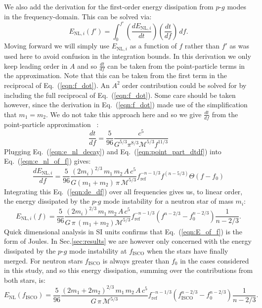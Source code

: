 We also add the derivation for the first-order energy dissipation from $p$-$g$ modes in the frequency-domain. This can be solved via:
\begin{equation}\label{eqn:e_nl_of_f}
    E_{\mathrm{NL}, i}\left(f'\right) = \int_0^{f'} \left(\frac{dE_{\mathrm{NL}, i}}{dt} \right) \left(\frac{dt}{df}\right) \, df.
\end{equation}
Moving forward we will simply use $E_{\mathrm{NL}, i}$ as a function of $f$ rather than $f'$ as was used here to avoid confusion in the integration bounds. In this derivation we only keep leading order in $A$ and so $\frac{dt}{df}$ can be taken from the point-particle terms in the approximation. Note that this can be taken from the first term in the reciprocal of Eq.~(\ref{eqn:f_dot}). An $A^2$ order contribution could be solved for by including the full reciprocal of Eq.~(\ref{eqn:f_dot}). Some care should be taken however, since the derivation in Eq.~(\ref{eqn:f_dot}) made use of the simplification that $m_1 = m_2$. We do not take this approach here and so we give $\frac{dt}{df}$ from the point-particle approximation ~\citep{maggiore2008gravitational}:
\begin{equation}\label{eqn:point_part_dtdf}
    \frac{dt}{df} = \frac{5}{96} \frac{c^5}{G^{5/3}  \pi^{8/3} \mathcal{M}^{5/3} f^{11/3}}
\end{equation}
Plugging Eq.~(\ref{eqn:e_nl_decay}) and Eq.~(\ref{eqn:point_part_dtdf}) into Eq.~(\ref{eqn:e_nl_of_f}) gives:
\begin{equation}\label{eqn:de_df}
    \frac{dE_{\mathrm{NL}, i}}{df} = \frac{5}{96} \frac{\left(2 m_i\right)^{2/3} \, m_1 \, m_2 \, A \, c^5}{G (m_1 + m_2)\, \pi \, \mathcal{M}^{5/3}} f_{\mathrm{ref}}^{-n-1/3} f^{(n-5/3)} \Theta(f-f_0)
\end{equation}
Integrating this Eq.~(\ref{eqn:de_df}) over all frequencies gives us, to linear order, the energy dissipated by the $p$-$g$ mode instability for a neutron star of mass $m_i$:
\begin{equation}\label{eqn:E_of_f}
    E_{\mathrm{NL}, i}(f) = \frac{5}{96} \frac{\left(2 m_i\right)^{2/3} \, m_1 \, m_2 \, A \, c^5}{G \, \pi \, (m_1 + m_2) \mathcal{M}^{5/3}} f_{\mathrm{ref}}^{-n-1/3} \left(f^{n-2/3} -f_0^{n-2/3}\right) \frac{1}{n-2/3}.
\end{equation}
Quick dimensional analysis in SI units confirms that Eq.~(\ref{eqn:E_of_f}) is the form of Joules. In Sec.\ref{sec:results} we are however only concerned with the energy dissipated by the $p$-$g$ mode instability at $f_{\mathrm{ISCO}}$ when the stars have finally merged. For neutron stars $f_{\mathrm{ISCO}}$ is always greater than $f_0$ in the cases considered in this study, and so this energy dissipation, summing over the contributions from both stars, is:
\begin{equation}\label{eqn:E_of_fisco}
    E_{\mathrm{NL}}(f_{\mathrm{ISCO}}) =  \frac{5}{96} \frac{\left(2 m_1 + 2 m_2 \right)^{2/3} \, m_1 \, m_2 \, A \, c^5}{G \, \pi \, \mathcal{M}^{5/3}} f_{\mathrm{ref}}^{-n-1/3} \left(f_{\mathrm{ISCO}}^{n-2/3} -f_0^{n-2/3}\right) \frac{1}{n-2/3}.
\end{equation}

